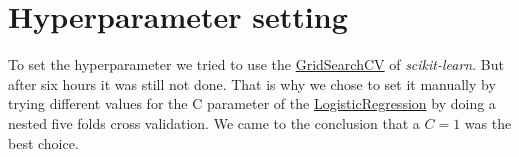 \section{Hyperparameter setting}
	To set the hyperparameter we tried to use the \href{http://scikit-learn.org/stable/modules/generated/sklearn.grid_search.GridSearchCV.html#sklearn.grid_search.GridSearchCV}{GridSearchCV} of \textit{scikit-learn}. But after six hours it was still not done. That is why we chose to set it manually by trying different values for the C parameter of the \href{http://scikit-learn.org/stable/modules/generated/sklearn.linear_model.LogisticRegression.html#sklearn.linear_model.LogisticRegression}{LogisticRegression} by doing a nested five folds cross validation. We came to the conclusion that a $C=1$ was the best choice.